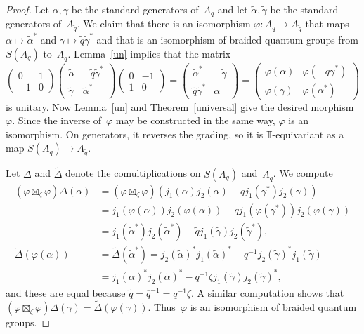 \documentclass[a4paper]{amsart}
\numberwithin{equation}{section}
\theoremstyle{definition}
\theoremstyle{remark}
\begin{document}
\begin{proof}
  Let \(\alpha,\gamma\) be the standard generators of~\(A_q\) and
  let \(\tilde{\alpha},\tilde{\gamma}\) be the standard generators
  of~\(A_{\tilde{q}}\).  We claim that there is an isomorphism
  \(\varphi\colon A_q\to A_{\tilde{q}}\) that maps \(\alpha\mapsto
  \tilde\alpha^*\) and \(\gamma\mapsto \tilde{q}\tilde\gamma^*\) and
  that is an isomorphism of braided quantum groups from \(S(A_q)\)
  to~\(A_{\tilde{q}}\).  Lemma~\ref{un} implies that the matrix
  \[
  \begin{pmatrix} 0&1\\-1&0 \end{pmatrix}
  \begin{pmatrix}
    \tilde\alpha&-\tilde{q}\tilde\gamma^*\\
    \tilde\gamma&\tilde\alpha^*
  \end{pmatrix}
  \begin{pmatrix} 0&-1\\1&0 \end{pmatrix}
  =
  \begin{pmatrix}
    \tilde\alpha^*&-\tilde\gamma\\
    \tilde{q}\tilde\gamma^*&\tilde\alpha
  \end{pmatrix}
  =
  \begin{pmatrix}
    \varphi(\alpha)&\varphi(-q \gamma^*)\\
    \varphi(\gamma)&\varphi(\alpha^*)
  \end{pmatrix}
  \]
  is unitary.  Now Lemma~\ref{un} and Theorem~\ref{universal} give
  the desired morphism~\(\varphi\).  Since the inverse
  of~\(\varphi\) may be constructed in the same way, \(\varphi\) is
  an isomorphism.  On generators, it reverses the grading, so it is
  \(\mathbb{T}\){\nobreakdash}-equivariant as a map \(S(A_q)\to
  A_{\tilde{q}}\).

  Let \(\Delta\) and \(\tilde\Delta\) denote the comultiplications
  on \(S(A_q)\) and~\(A_{\tilde{q}}\).  We compute
  \begin{align*}
    (\varphi\boxtimes_\zeta\varphi)\Delta(\alpha)
    &= (\varphi\boxtimes_\zeta\varphi) (j_1(\alpha)j_2(\alpha) -
    qj_1(\gamma^*) j_2(\gamma))
    \\&= j_1(\varphi(\alpha)) j_2(\varphi(\alpha))
    - qj_1(\varphi(\gamma^*)) j_2(\varphi(\gamma))
    \\&= j_1(\tilde\alpha^*) j_2(\tilde\alpha^*)
    - \tilde{q} j_1(\tilde\gamma) j_2(\tilde\gamma^*),\\
    \tilde\Delta(\varphi(\alpha))
    &= \tilde\Delta(\tilde\alpha^*)
    = j_2(\tilde\alpha)^* j_1(\tilde\alpha)^* -
    q^{-1} j_2(\tilde\gamma)^* j_1(\tilde\gamma)
    \\&= j_1(\tilde\alpha)^* j_2(\tilde\alpha)^* -
    q^{-1} \zeta j_1(\tilde\gamma) j_2(\tilde\gamma)^*,
  \end{align*}
  and these are equal because \(\tilde{q} = {\overline{q}}^{-1} =
  q^{-1}\zeta\).  A similar computation shows that
  \((\varphi\boxtimes_\zeta\varphi)\Delta(\gamma)
  =\tilde\Delta(\varphi(\gamma))\).  Thus~\(\varphi\) is an
  isomorphism of braided quantum groups.
\end{proof}
\end{document}
